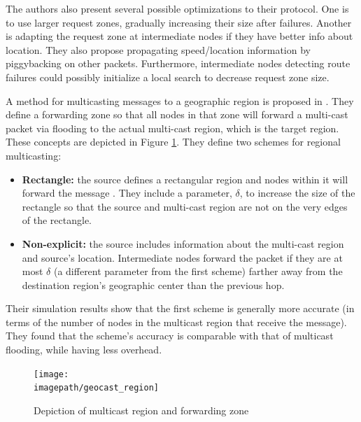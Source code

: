\documentclass[conference]{IEEEtran}
\newcommand{\imagepath}{../../images/external/location_routing}
\begin{document}

The authors also present several possible optimizations to their protocol.
One is to use larger request zones, gradually increasing their size after failures.
Another is adapting the request zone at intermediate nodes if they have better info about location.
They also propose propagating speed/location information by piggybacking on other packets.
Furthermore, intermediate nodes detecting route failures could possibly initialize a local search to decrease request zone size.

A method for multicasting messages to a geographic region is proposed in \cite{749282}.
They define a forwarding zone so that all nodes in that zone will forward a multi-cast packet via flooding to the actual multi-cast region, which is the target region.
These concepts are depicted in Figure \ref{fig:multicast-region}.
They define two schemes for regional multicasting:
\begin{itemize}
\item \textbf{Rectangle:} the source defines a rectangular region and nodes within it will forward the message .
They include a parameter, $\delta$, to increase the size of the rectangle so that the source and multi-cast region are not on the very edges of the rectangle.          
\item \textbf{Non-explicit:} the source includes information about the multi-cast region and source's location.
Intermediate nodes forward the packet if they are at most $\delta$ (a different parameter from the first scheme) farther away from the destination region's geographic center than the previous hop.
\end{itemize}
Their simulation results show that the first scheme is generally more accurate (in terms of the number of nodes in the multicast region that receive the message).
They found that the scheme's accuracy is comparable with that of multicast flooding, while having less overhead.

\begin{figure}
\label{fig:multicast-region}
\centering
\texttt{[image: \\imagepath/geocast\_region]}
\caption{Depiction of multicast region and forwarding zone}
\end{figure}
\end{document}
